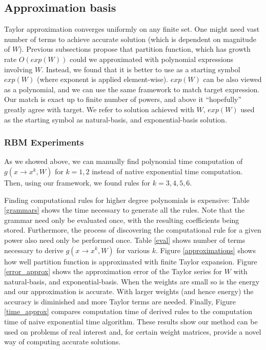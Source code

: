 \subsection{Approximation basis}
Taylor approximation converges uniformly on any finite set. One
might need vast number of terms to achieve accurate solution (which is
dependent on magnitude of $W$). Previous subsections
propose that partition function, which has growth rate $O(exp(W))$ could we approximated
with polynomial expressions involving $W$. Instead, we found that it is better
to use as a starting symbol $exp(W)$ (where exponent is applied element-wise). 
$exp(W)$ can be also viewed as a polynomial, and we can use the same framework
to match target expression. Our match is exact up to finite number of powers, and 
above it ``hopefully'' greatly agree with target. We refer to solution achieved
with $W$, $exp(W)$ used as the starting symbol as natural-basis, and exponential-basis solution. 

\subsubsection{RBM Experiments}

As we showed above, we can manually find
polynomial time computation of $g(x \rightarrow x^k, W)$ for $k = 1, 2$
instead of native exponential time computation. Then, using our
framework, we found rules for $k = 3, 4, 5, 6$.  


Finding computational rules for higher degree
polynomials is expensive: Table \ref{grammars} shows the time
necessary to generate all the rules. Note that the grammar
need only be evaluated once, with the resulting coefficients being
stored. Furthermore, the process of discovering the computational rule
for a given power also need only be performed once. 
Table \ref{eval} shows number of terms necessary to derive $g(x
\rightarrow x^k, W)$ for various $k$. Figure \ref{approximations}
shows how well partition function is approximated with finite Taylor
expansion. Figure \ref{error_approx} shows the approximation error of
the Taylor series for $W$ with natural-basis, and exponential-basis. When the weights are small so is the energy
and our approximation is accurate. With larger weights (and hence
energy) the accuracy is diminished and more Taylor terms are needed. Finally,
Figure \ref{time_approx} compares computation time of derived rules to
the computation time of naive exponential time algorithm.
These results show our method can be used on problems of real interest
and, for certain weight matrices, provide a novel way of computing accurate solutions. 


